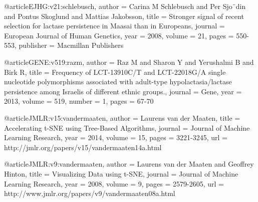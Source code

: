 @article{EJHG:v21:schlebusch,
	author    = {Carina M Schlebusch and Per Sjo¨din and Pontus Skoglund and Mattias Jakobsson},
	title     = {Stronger signal of recent selection for lactase persistence in Maasai than in Europeans},
	journal   = {European Journal of Human Genetics},
	year      = {2008},
	volume    = {21},
	pages     = {550-553},
	publisher = {Macmillan Publishers}
}

@article{GENE:v519:razm,
	author    = {Raz M and Sharon Y and Yerushalmi B and Birk R},
	title     = {Frequency of LCT-13910C/T and LCT-22018G/A single nucleotide polymorphisms associated with adult-type hypolactasia/lactase persistence among Israelis of different ethnic groups.},
	journal   = {Gene},
	year      = {2013},
	volume    = {519},
	number    = {1},
	pages     = {67-70}
}

@article{JMLR:v15:vandermaaten,
	author    = {Laurens van der Maaten},
	title     = {Accelerating t-SNE using Tree-Based Algorithms},
	journal   = {Journal of Machine Learning Research},
	year      = {2014},
	volume    = {15},
	pages     = {3221-3245},
	url       = {http://jmlr.org/papers/v15/vandermaaten14a.html}
}

@article{JMLR:v9:vandermaaten,
	author    = {Laurens van der Maaten and Geoffrey Hinton},
	title     = {Visualizing Data using t-SNE},
	journal   = {Journal of Machine Learning Research},
	year      = {2008},
	volume    = {9},
	pages     = {2579-2605},
	url       = {http://www.jmlr.org/papers/v9/vandermaaten08a.html}
}
